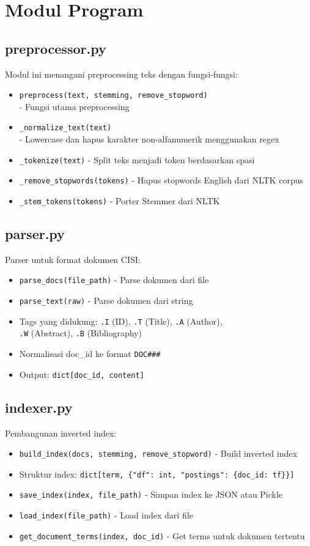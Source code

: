 \documentclass[12pt,a4paper]{report}
\begin{document}
\section{Modul Program}

\subsection{preprocessor.py}
Modul ini menangani preprocessing teks dengan fungsi-fungsi:
\begin{itemize}
    \item \texttt{preprocess(text, stemming, remove\_stopword)}\\ - Fungsi utama preprocessing
    \item \texttt{\_normalize\_text(text)}\\ - Lowercase dan hapus karakter non-alfanumerik menggunakan regex
    \item \texttt{\_tokenize(text)} - Split teks menjadi token berdasarkan spasi
    \item \texttt{\_remove\_stopwords(tokens)} - Hapus stopwords English dari NLTK corpus
    \item \texttt{\_stem\_tokens(tokens)} - Porter Stemmer dari NLTK
\end{itemize}

\subsection{parser.py}
Parser untuk format dokumen CISI:
\begin{itemize}
    \item \texttt{parse\_docs(file\_path)} - Parse dokumen dari file
    \item \texttt{parse\_text(raw)} - Parse dokumen dari string
    \item Tags yang didukung: \texttt{.I} (ID), \texttt{.T} (Title), \texttt{.A} (Author), \\ \texttt{.W} (Abstract), \texttt{.B} (Bibliography)
    \item Normalisasi doc\_id ke format \texttt{DOC\#\#\#}
    \item Output: \texttt{dict[doc\_id, content]}
\end{itemize}

\subsection{indexer.py}
Pembangunan inverted index:
\begin{itemize}
    \item \texttt{build\_index(docs, stemming, remove\_stopword)} - Build inverted index
    \item Struktur index: \texttt{dict[term, \{"df": int, "postings": \{doc\_id: tf\}\}]}
    \item \texttt{save\_index(index, file\_path)} - Simpan index ke JSON atau Pickle
    \item \texttt{load\_index(file\_path)} - Load index dari file
    \item \texttt{get\_document\_terms(index, doc\_id)} - Get terms untuk dokumen tertentu
\end{itemize}
\end{document}
